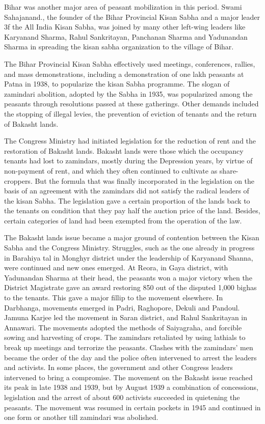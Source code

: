 \begin{multicols}{2}
Bihar was another major area of peasant mobilization in this period. Swami Sahajanand., the founder of the Bihar Provincial Kisan Sabha and a major leader 3f the All India Kisan Sabha, was joined by many other left-wing leaders like Karyanand Sharma, Rahul Sankritayan, Panchanan Sharma and Yadunandan Sharma in spreading the kisan sabha organization to the village of Bihar.

The Bihar Provincial Kisan Sabha effectively used meetings, conferences, rallies, and mass demonstrations, including a demonstration of one lakh peasants at Patna in 1938, to popularize the kisan Sabha programme. The slogan of zamindari abolition, adopted by the Sabha in 1935, was popularized among the peasants through resolutions passed at these gatherings. Other demands included the stopping of illegal levies, the prevention of eviction of tenants and the return of Bakasht lands.

The Congress Ministry had initiated legislation for the reduction of rent and the restoration of Bakasht lands. Bakasht lands were those which the occupancy tenants had lost to zamindars, mostly during the Depression years, by virtue of non-payment of rent, and which they often continued to cultivate as share-croppers. But the formula that was finally incorporated in the legislation on the basis of an agreement with the zamindars did not satisfy the radical leaders of the kisan Sabha. The legislation gave a certain proportion of the lands back to the tenants on condition that they pay half the auction price of the land. Besides, certain categories of land had been exempted from the operation of the law.

The Bakasht lands issue became a major ground of contention between the Kisan Sabha and the Congress Ministry. Struggles, such as the one already in progress in Barahiya tal in Monghyr district under the leadership of Karyanand Shanna, were continued and new ones emerged. At Reora, in Gaya district, with Yadunandan Sharma at their head, the peasants won a major victory when the District Magistrate gave an award restoring 850 out of the disputed 1,000 bighas to the tenants. This gave a major fillip to the movement elsewhere. In Darbhanga, movements emerged in Padri, Raghopore, Dekuli and Pandoul. Jamuna Karjee led the movement in Saran district, and Rahul Sankritayan in Annawari. The movements adopted the methods of Saiyagraha, and forcible sowing and harvesting of crops. The zamindars retaliated by using lathials to break up meetings and terrorize the peasants. Clashes with the zamindars' men became the order of the day and the police often intervened to arrest the leaders and activists. In some places, the government and other Congress leaders intervened to bring a compromise. The movement on the Bakasht issue reached its peak in late 1938 and 1939, but by August 1939 a combination of concessions, legislation and the arrest of about 600 activists succeeded in quietening the peasants. The movement was resumed in certain pockets in 1945 and continued in one form or another till zamindari was abolished.


\end{multicols}

